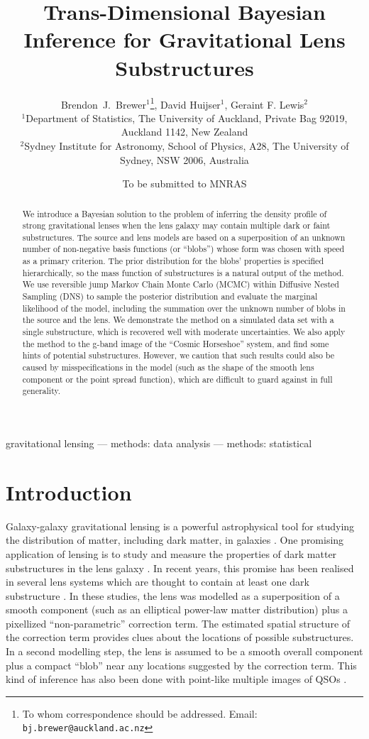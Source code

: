 \documentclass[useAMS,usenatbib]{mn2e}
\title[]
{Trans-Dimensional Bayesian Inference for Gravitational Lens Substructures}
\author[Brewer, Huijser and Lewis]{%
  Brendon~J.~Brewer$^{1}$\thanks{To whom correspondence should be addressed. Email: {\tt bj.brewer@auckland.ac.nz}},
  David Huijser$^{1}$,
  Geraint F. Lewis$^2$
  \medskip\\
  $^1$Department of Statistics, The University of Auckland, Private Bag 92019, Auckland 1142, New Zealand\\
  $^2$Sydney Institute for Astronomy, School of Physics, A28,
  The University of Sydney, NSW 2006, Australia}
\begin{document}
             
\date{To be submitted to MNRAS}
             
\maketitle

\label{firstpage}

\begin{abstract}
We introduce a Bayesian solution to the problem of inferring the density
profile of strong gravitational lenses when the lens galaxy may contain
multiple dark or faint substructures. The source and lens models are based on
a superposition of an unknown number of non-negative basis functions
(or ``blobs'') whose form was chosen with speed as a primary criterion.
The prior distribution for the blobs' properties is specified hierarchically,
so the mass function of substructures is a natural output of the method.
We use reversible
jump Markov Chain Monte Carlo (MCMC) within Diffusive Nested Sampling (DNS) to
sample the posterior distribution and evaluate the marginal likelihood of the
model, including the summation over the unknown
number of blobs in the source and the lens.
We demonstrate the method on a simulated data set with a single
substructure, which is recovered well with moderate uncertainties. We also
apply the method to the g-band
image of the ``Cosmic Horseshoe'' system, and find some
hints of potential substructures. However, we caution that such results could
also be caused by misspecifications in the model (such as the shape of
the smooth lens component or the point spread function),
which are difficult to guard against in full generality.
\end{abstract}


\begin{keywords}
gravitational lensing --- methods: data analysis --- methods: statistical
\end{keywords}

\section{Introduction}
Galaxy-galaxy gravitational lensing is a powerful astrophysical tool for studying
the distribution of matter, including dark matter, in galaxies
\citep{treu}. One promising application of lensing is to study
and measure the properties of dark matter substructures in the lens
galaxy \citep{koopmans}.
In recent years, this promise has been realised in several lens systems
which are thought to contain at least one dark substructure
\citep{vegetti1, vegetti2, vegetti3}. In these studies, the lens was modelled
as a superposition of a smooth component (such as an elliptical power-law
matter distribution) plus a pixellized ``non-parametric'' correction term.
The estimated spatial structure of the correction term provides clues about
the locations of possible substructures. In a second modelling step, the lens
is assumed to be a smooth overall component plus a compact ``blob'' near any
locations suggested by the correction term. This kind of inference has also
been done with point-like multiple images of QSOs \citep{2012MNRAS.419..936F}.
\end{document}
